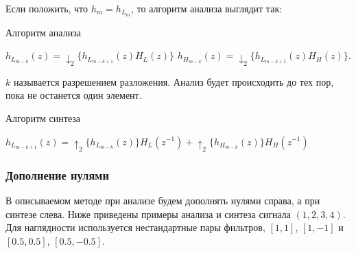 \documentclass{article}
\begin{document}
Если положить, что $h_m = h_{L_m}$, то алгоритм анализа выглядит так:
\begin{algorithm}
\caption{Алгоритм анализа}
\begin{algorithmic}
	\State $h_{L_{m-k}}(z) = \downarrow_2 \{h_{L_{m-k+1}}(z)H_L(z)\}$
	\State $h_{H_{m-k}}(z) = \downarrow_2 \{h_{L_{m-k+1}}(z)H_H(z)\}.$
	\EndFor
\end{algorithmic}
\end{algorithm}


$k$ называется разрешением разложения. Анализ будет происходить до тех пор, пока не останется один элемент.
\begin{algorithm}[H]
\caption{Алгоритм синтеза}
\begin{algorithmic}
		\State$h_{L_{m-k + 1}}(z) = \uparrow_2 \{ h_{L_{m-k}}(z) \} H_L(z^{-1}) + \uparrow_2 \{ h_{H_{m-k}}(z) \} H_H(z^{-1})$
	\EndFor
\end{algorithmic}
\end{algorithm}	

\subsubsection{Дополнение нулями}
В описываемом методе при анализе будем дополнять нулями справа, а при синтезе слева. Ниже приведены примеры анализа и синтеза сигнала $(1,2,3,4)$. Для наглядности используется нестандартные пары фильтров, $[1,1]$, $[1,-1]$ и $[0.5,0.5]$, $[0.5,-0.5]$.
\begin{center}
\end{center}
\end{document}

